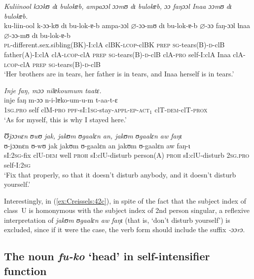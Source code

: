 \documentclass[output=paper]{langscibook}
\begin{document}
\ea
  \label{ex:Creissels:42}
   \ea\label{ex:Creissels:42a}
      \textit{Kuliinool kɔɔkʊ dɩ bulokɐb, ampaɔɔl ɔɔmʊ dɩ bulokɐb, ɔɔ faŋɔɔl Inaa ɔɔmʊ dɩ bulokɐb.}\\
      \gll ku-liin-ool k-ɔɔ-kʊ dɩ bu-lok-ɐ-b ampa-ɔɔl $\varnothing$-ɔɔ-mʊ dɩ bu-lok-ɐ-b $\varnothing$-ɔɔ faŋ-ɔɔl Ɩnaa $\varnothing$-ɔɔ-mʊ dɩ bu-lok-ɐ-b\\
      \textsc{pl}-different.sex.sibling(BK)-I:clA clBK-\textsc{lcop}-clBK
      \textsc{prep} \textsc{sg}-tears(B)-\textsc{d}-clB father(A)-I:clA
      clA-\textsc{lcop}-clA \textsc{prep} \textsc{sg}-tears(B)-\textsc{d}-clB
      clA-\textsc{pro} self-I:clA Inaa clA-\textsc{lcop}-clA \textsc{prep}
      \textsc{sg}-tears(B)-\textsc{d}-clB\\
      \glt `Her brothers are in tears, her father is in tears,
      and Inaa herself is in tears.'

    \ex\label{ex:Creissels:42b}
      \textit{Inje faŋ, mɔɔ nilɐkoumum taatɛ.}\\
      \gll inje faŋ m-ɔɔ n-i-lɐko-um-u-m t-aa-t-ɛ\\
      \textsc{1sg.pro} self clM-\textsc{pro}
      \textsc{ppf}-sI:\textsc{1sg}-stay-\textsc{appl-ep-act$_1$}
      clT-\textsc{dem}-clT-\textsc{prox}\\
      \glt `As for myself, this is why I stayed here.'

    \ex\label{ex:Creissels:42c}
      \textit{Ʊjɔɔnɛn ʊwʊ jak, jakʊm ʊgaalɛn an, jakʊm ʊgaalɛn aw faŋɩ}\\
      \gll ʊ-jɔɔnɛn ʊ-wʊ jak jakʊm ʊ-gaalɛn an jakʊm ʊ-gaalɛn aw faŋ-ɩ\\
      sI:\textsc{2sg}-fix clU-\textsc{dem} well \textsc{proh} sI:clU-disturb
      person(A) \textsc{proh} sI:clU-disturb \textsc{2sg.pro} self-I:\textsc{2sg}\\
      \glt `Fix that properly, so that it doesn't disturb anybody, and it doesn't
      disturb yourself.'

  \z
\z

Interestingly, in (\ref{ex:Creissels:42c}), in spite of the fact that the subject index of class~U is homonymous with the subject index of 2nd person singular, a reflexive interpretation of \textit{jakʊm ʊgaalɛn aw faŋɩ} (that is, `don't disturb yourself') is excluded, since if it were the case, the verb form should
include the suffix \textit{‑ɔɔrɔ}.

\subsection{The noun \textit{fu-ko} `head' in self-intensifier function}%
\label{sec:Creissels:fuko}
\end{document}
